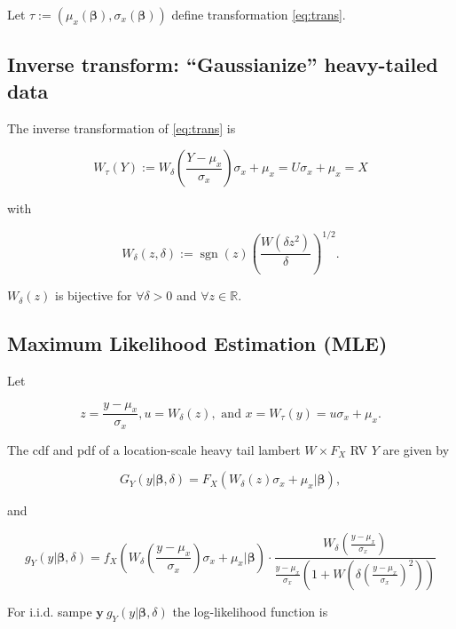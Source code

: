 \documentclass[8pt,oneside]{extbook}
\newcommand{\Real}{\mathbb{R}}
\newcommand{\vect}[1]{\boldsymbol{#1}}
\DeclareMathOperator*{\sgn}{sgn}
\begin{document}
Let $\tau:=(\mu_x(\vect{\beta}),\sigma_x(\vect{\beta}))$ define transformation
\cref{eq:trans}.

\newpage

\subsection{Inverse transform: ``Gaussianize'' heavy-tailed data}

The inverse transformation of \cref{eq:trans} is

\begin{equation}
W_\tau(Y):=W_\delta\left(\frac{Y-\mu_x}{\sigma_x}\right)\sigma_x
+\mu_x = U\sigma_x+\mu_x=X
\end{equation}

with

\begin{equation}
W_\delta(z,\delta) := \sgn(z)\left(\frac{W(\delta z^2)}{\delta}\right)^{1/2}.
\end{equation}

$W_\delta(z)$ is bijective for $\forall \delta>0$ and $\forall z\in\Real$.

\subsection{Maximum Likelihood Estimation (MLE)}

Let

$$
z=\frac{y-\mu_x}{\sigma_x},
u=W_\delta(z),
\text{ and }
x=W_\tau(y)=u\sigma_x+\mu_x.
$$

The cdf and pdf of a location-scale heavy tail lambert 
$W\times F_X$ RV $Y$ are given by

\begin{equation}
    G_Y(y|\vect{\beta},\delta) = F_X(W_\delta(z)\sigma_x+\mu_x|\vect{\beta}),
\end{equation}

and

\begin{equation}
    g_Y(y|\vect{\beta},\delta)=f_X\left(
        W_\delta\left(\frac{y-\mu_x}{\sigma_x}\right)
    \sigma_x+\mu_x |\vect{\beta}\right)
    \cdot
    \frac{W_\delta\left(\frac{y-\mu_x}{\sigma_x}\right)}
    {\frac{y-\mu_x}{\sigma_x}\left(1+W\left(\delta\left(\frac{y-\mu_x}{\sigma_x}\right)^2\right)
    \right)}
\end{equation}

For i.i.d. sampe $\vect{y}~g_Y(y|\vect{\beta},\delta)$ the log-likelihood function
is
\end{document}
